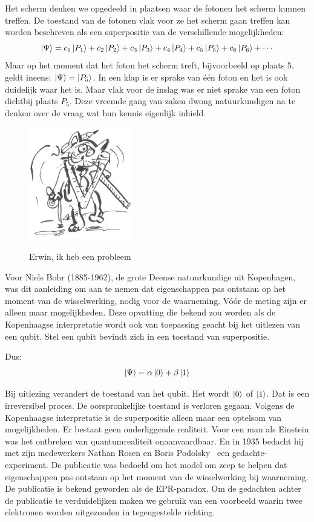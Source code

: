 \documentclass[../../main.tex]{subfiles}
\begin{document}
Het scherm denken we opgedeeld in plaatsen waar de fotonen het scherm kunnen treffen. De toestand van de fotonen vlak voor ze het scherm gaan treffen kan worden beschreven als een superpositie van de verschillende mogelijkheden:
\[\ket{\Psi} = c_1\ket{P_1} + c_2\ket{P_2} + c_3\ket{P_3} + c_4\ket{P_4} + c_5\ket{P_5} + c_6\ket{P_6} +\cdots\]
Maar op het moment dat het foton het scherm treft, bijvoorbeeld op plaats 5, geldt ineens:  
$\ket{\Psi} = \ket{P_5}$. In een klap is er sprake van \'e\'en foton en het is ook duidelijk waar het is. Maar vlak voor de inslag was er niet sprake van een foton dichtbij plaats $P_5$. 
Deze vreemde gang van zaken dwong natuurkundigen na te denken over de vraag wat hun kennis eigenlijk inhield. 

\begin{figure}
\centering
\includegraphics[width=0.4\textwidth]{./img/meetprobleem.jpg}\par
Erwin, ik heb een probleem
\end{figure}
Voor Niels Bohr (1885-1962), de grote Deense natuurkundige uit Kopenhagen, was dit aanleiding om aan te nemen dat eigenschappen pas ontstaan op het moment van de wisselwerking, nodig voor de waarneming. V\'o\'or de meting zijn er alleen maar mogelijkheden. 
Deze opvatting die bekend zou worden als de Kopenhaagse interpretatie wordt ook van toepassing geacht bij het uitlezen van een qubit. 
Stel  een qubit bevindt zich in een toestand van superpositie. 

Dus:
\[\ket{\Psi} = \alpha \ket{0} +\beta\ket{1}\]

Bij uitlezing verandert de toestand van het qubit. Het wordt $\ket{0}$ of $\ket{1}$. Dat is een irreversibel proces. De oorspronkelijke toestand is verloren gegaan. 
Volgens de Kopenhaagse interpretatie is de superpositie alleen maar een optelsom van mogelijkheden. Er bestaat geen onderliggende realiteit. 
Voor een man als Einstein was het ontbreken van quantumrealiteit onaanvaardbaar. En in 1935 bedacht hij met zijn medewerkers Nathan Rosen en Boris Podolsky~\cite{Einstein1935} een gedachte-experiment. De publicatie was bedoeld om het model om zeep te helpen dat eigenschappen pas ontstaan op het moment van de wisselwerking bij waarneming. De publicatie is bekend  geworden als de EPR-paradox. Om de gedachten achter de publicatie te verduidelijken maken we gebruik van een voorbeeld waarin twee elektronen worden uitgezonden in tegengestelde richting.
\end{document}
